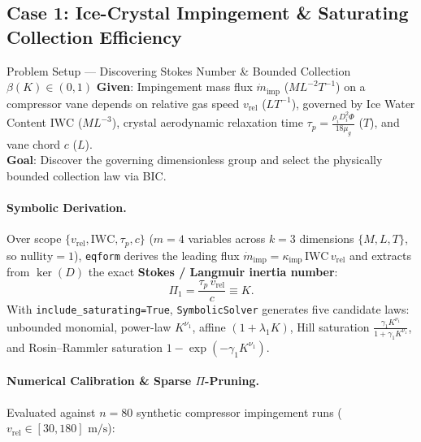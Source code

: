 \documentclass[11pt,a4paper]{article}
\begin{document}
\subsection{Case 1: Ice-Crystal Impingement \& Saturating Collection Efficiency}

\begin{setupbox}{Problem Setup — Discovering Stokes Number \& Bounded Collection $\beta(K) \in (0,1)$}
\textbf{Given}: Impingement mass flux $\dot{m}_{\text{imp}}$ ($ML^{-2}T^{-1}$) on a compressor vane depends on relative gas speed $v_{\text{rel}}$ ($LT^{-1}$), governed by Ice Water Content $\text{IWC}$ ($ML^{-3}$), crystal aerodynamic relaxation time $\tau_p = \frac{\rho_i D_i^2 \Phi}{18\mu_g}$ ($T$), and vane chord $c$ ($L$).\\
\textbf{Goal}: Discover the governing dimensionless group and select the physically bounded collection law via BIC.
\end{setupbox}

\paragraph{Symbolic Derivation.}
Over scope $\{v_{\text{rel}}, \text{IWC}, \tau_p, c\}$ ($m = 4$ variables across $k = 3$ dimensions $\{M, L, T\}$, so $\text{nullity} = 1$), \texttt{eqform} derives the leading flux $\dot{m}_{\text{imp}} = \kappa_{\text{imp}}\,\text{IWC}\,v_{\text{rel}}$ and extracts from $\ker(D)$ the exact \textbf{Stokes / Langmuir inertia number}:
\begin{equation}
  \Pi_1 = \frac{\tau_p\, v_{\text{rel}}}{c} \equiv K.
\end{equation}
With \texttt{include\_saturating=True}, \texttt{SymbolicSolver} generates five candidate laws: unbounded monomial, power-law $K^{\nu_1}$, affine $(1 + \lambda_1 K)$, Hill saturation $\frac{\gamma_1 K^{\nu_1}}{1 + \gamma_1 K^{\nu_1}}$, and Rosin--Rammler saturation $1 - \exp(-\gamma_1 K^{\nu_1})$.

\paragraph{Numerical Calibration \& Sparse $\Pi$-Pruning.}
Evaluated against $n = 80$ synthetic compressor impingement runs ($v_{\text{rel}} \in [30, 180]\text{ m/s}$):
\end{document}
